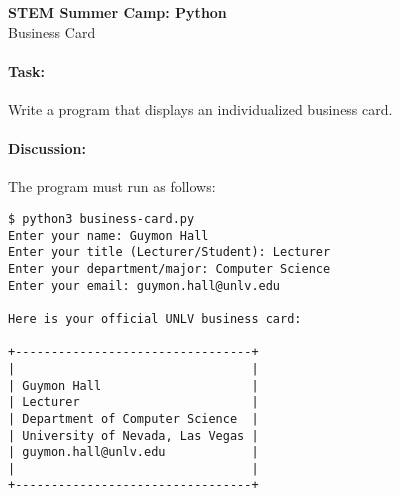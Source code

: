 \documentclass[11pt]{article}
\begin{document}
    \begin{center}

        \large\textbf{STEM Summer Camp: Python} \\
        Business Card \\

    \end{center}

    \paragraph{Task:} Write a program that displays an
    individualized business card.  
    
    \paragraph{Discussion:} The program must run as follows:
    
    \vspace{1.5em}

\begin{verbatim}
$ python3 business-card.py
Enter your name: Guymon Hall
Enter your title (Lecturer/Student): Lecturer
Enter your department/major: Computer Science
Enter your email: guymon.hall@unlv.edu

Here is your official UNLV business card:

+---------------------------------+
|                                 |
| Guymon Hall                     |
| Lecturer                        |
| Department of Computer Science  |
| University of Nevada, Las Vegas |
| guymon.hall@unlv.edu            |
|                                 |
+---------------------------------+
\end{verbatim}
    
\end{document}
